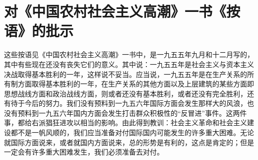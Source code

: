 \section[对《中国农村社会主义高潮》一书《按语》的批示（一九五八年三月十九日）]{对《中国农村社会主义高潮》一书《按语》的批示}


这些按语见《中国农村社会主义高潮》一书中，是一九五五年九月和十二月写的，其中有些现在还没有丧失它们的意义。其中说：一九五五年是社会主义与资本主义决战取得基本胜利的一年，这样说不妥当。应当说，一九五五年是在生产关系的所有制方面取得基本胜利的一年，在生产关系的其他方面以及上层建筑的某些方面即思想战线方面和政治战线方面，则或者还没有基本胜利，或者还没有完全胜利，还有待于今后的努力。我们没有预料到一九五六年国际方面会发生那样大的风浪，也没有预料到一九五六年国内方面会发生打击群众积极性的“反冒进”事件。这两件事，都给右派猖狂进攻以相当的影响。由此得到教训：社会主义革命和社会主义建设都不是一帆风顺的，我们应当准备对付国际国内可能发生的许多重大困难。无论就国际方面说来，或者就国内方面说来，总的形势是有利的，这点是肯定的；但是一定会有许多重大困难发生，我们必须准备去对付。


